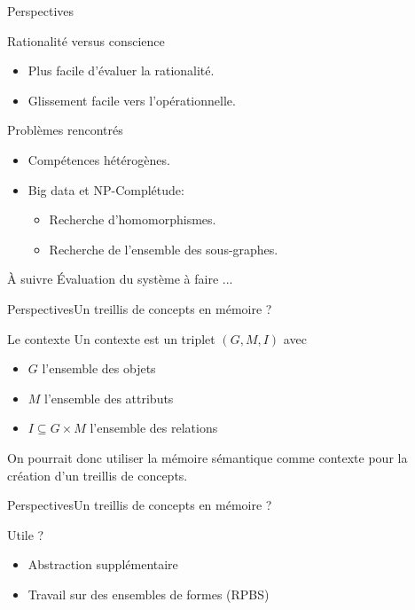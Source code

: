 \begin{frame}{Perspectives}

\begin{block}{Rationalité versus conscience}
\begin{itemize}
\item Plus facile d'évaluer la rationalité.
\item Glissement facile vers l'opérationnelle.
\end{itemize}
\end{block}

\pause

\begin{block}{Problèmes rencontrés}
\begin{itemize}
\item Compétences hétérogènes.
\item Big data et NP-Complétude:
\begin{itemize}
\item Recherche d'homomorphismes.
\item Recherche de l'ensemble des sous-graphes.
\end{itemize}
\end{itemize}
\end{block}

\pause

\begin{block}{À suivre}
Évaluation du système à faire ...
\end{block}

\end{frame}

\begin{frame}{Perspectives}{Un treillis de concepts en mémoire ?}
\begin{block}{Le contexte}
Un contexte est un triplet $(G,M,I)$ avec
\begin{itemize}
\item $G$ l'ensemble des objets
\item $M$ l'ensemble des attributs
\item $I \subseteq G \times M$ l'ensemble des relations
\end{itemize}
On pourrait donc utiliser la mémoire sémantique comme contexte pour la création d'un treillis de concepts.
\end{block}
\end{frame}

\begin{frame}{Perspectives}{Un treillis de concepts en mémoire ?}
\begin{block}{Utile ?}
\begin{itemize}
\item Abstraction supplémentaire
\item Travail sur des ensembles de formes (RPBS)
\end{itemize}
\end{block}
\end{frame}

